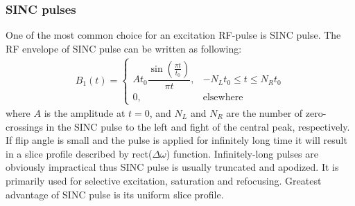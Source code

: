 \subsubsection{SINC pulses}
One of the most common choice for an excitation RF-pulse is SINC pulse. 
The RF envelope of SINC pulse can be written as following:
\begin{equation}\label{eq: SINC}
\begin{aligned}
B_1(t) = \begin{cases} A t_0 \dfrac{\sin \left( \tfrac{\pi t}{t_0}\right)}{\pi t},& -N_L t_0 \leq t \leq N_R t_0\\
0,& \mathrm{elsewhere}
\end{cases}
\end{aligned}
\end{equation}
where $A$ is the amplitude at $t = 0$, and $N_L$ and $N_R$  are the number of zero-crossings in the SINC pulse to the left and fight of the central peak, respectively. 
If flip angle is small and the pulse is applied for infinitely long time it will result in a slice profile described by rect($\Delta \omega$) function. 
Infinitely-long pulses are obviously impractical thus SINC pulse is usually truncated and apodized. 
It is primarily used for selective excitation, saturation and refocusing. 
Greatest advantage of SINC pulse is its uniform slice profile.
